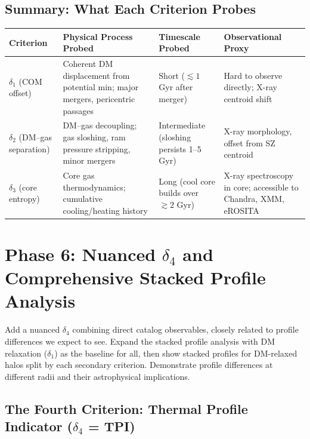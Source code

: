 \documentclass[12pt,a4paper]{article}
\begin{document}
\subsection{Summary: What Each Criterion Probes}

\begin{center}
\begin{tabular}{p{2.2cm}p{4.5cm}p{4.5cm}p{2.8cm}}
\toprule
Criterion & Physical Process Probed & Timescale Probed & Observational Proxy \\
\midrule
$\delta_1$ (COM offset) &
  Coherent DM displacement from potential min; major mergers, pericentric passages &
  Short ($\lesssim\!1$ Gyr after merger) &
  Hard to observe directly; X-ray centroid shift \\
$\delta_2$ (DM--gas separation) &
  DM--gas decoupling; gas sloshing, ram pressure stripping, minor mergers &
  Intermediate (sloshing persists 1--5 Gyr) &
  X-ray morphology, offset from SZ centroid \\
$\delta_3$ (core entropy) &
  Core gas thermodynamics; cumulative cooling/heating history &
  Long (cool core builds over $\gtrsim\!2$ Gyr) &
  X-ray spectroscopy in core; accessible to Chandra, XMM, eROSITA \\
\bottomrule
\end{tabular}
\end{center}

\section{Phase 6: Nuanced $\delta_4$ and Comprehensive Stacked Profile Analysis}
\label{sec:phase6}

\begin{querybox}
\textcolor{red!80!black}{%
Add a nuanced $\delta_4$ combining direct catalog observables, closely related to profile
differences we expect to see. Expand the stacked profile analysis with DM relaxation
($\delta_1$) as the baseline for all, then show stacked profiles for DM-relaxed halos
split by each secondary criterion. Demonstrate profile differences at different radii
and their astrophysical implications.}
\end{querybox}

\subsection{The Fourth Criterion: Thermal Profile Indicator ($\delta_4$ = TPI)}
\end{document}
